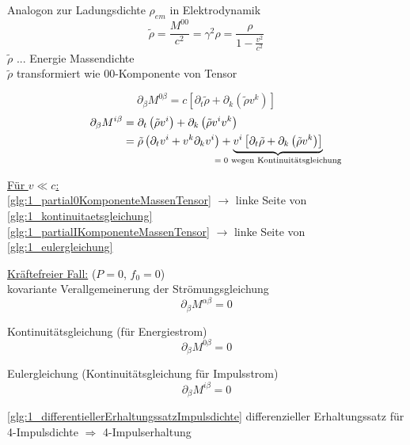 \documentclass[a4paper, 11pt]{article}
\numberwithin{equation}{section}
\newcommand{\ubtext}[2]{\underbrace{#1}_{\mathclap{\text{#2}}}}
\begin{document}
Analogon zur Ladungsdichte $\rho_{em}$ in Elektrodynamik
\begin{equation}
\tilde{\rho} = \dfrac{M^{00}}{c^2} = \gamma^2 \rho = \dfrac{\rho}{1- \frac{v^2}{c^2}}
\end{equation}
$\tilde{\rho}$ $...$ Energie Massendichte\\
$\tilde{\rho}$ transformiert wie $00$-Komponente von Tensor

\begin{equation}\label{glg:1_partial0KomponenteMassenTensor}
\partial_\beta M^{0 \beta} = c \left[ \partial_t \tilde{\rho} + \partial_k \left(\tilde{\rho} v^k \right) \right]
\end{equation}
\begin{equation}\label{glg:1_partialIKomponenteMassenTensor}
\begin{aligned}
\partial_\beta M^{i \beta} &=  \partial_t \left( \tilde{\rho} v^i \right) + \partial_k \left(\tilde{\rho} v^i v^k \right) \\
&= \tilde{\rho} \left( \partial_t v^i + v^k \partial_k v^i \right) + \ubtext{ v^i \left[ \partial_t \tilde{\rho} + \partial_k \left(\tilde{\rho} v^k \right) \right]}{$=0$ wegen Kontinuitätsgleichung}
\end{aligned}
\end{equation}

\underline{Für $v \ll c$:}\\
\ref{glg:1_partial0KomponenteMassenTensor} $\rightarrow$ linke Seite von \ref{glg:1_kontinuitaetsgleichung}\\
\ref{glg:1_partialIKomponenteMassenTensor} $\rightarrow$ linke Seite von \ref{glg:1_eulergleichung}


\underline{Kräftefreier Fall:} ($P=0$, $f_0=0$)\\
kovariante Verallgemeinerung der Strömungsgleichung
\begin{equation}\label{glg:1_differentiellerErhaltungssatzImpulsdichte}
\partial_\beta M^{\alpha \beta} = 0
\end{equation} 

Kontinuitätsgleichung (für Energiestrom)
\begin{equation}
\partial_\beta M^{0 \beta} = 0
\end{equation}

Eulergleichung (Kontinuitätsgleichung für Impulsstrom)
\begin{equation}
\partial_\beta M^{i \beta} = 0
\end{equation}

\ref{glg:1_differentiellerErhaltungssatzImpulsdichte} differenzieller Erhaltungssatz für 4-Impulsdichte $\Rightarrow$ 4-Impulserhaltung
\end{document}
